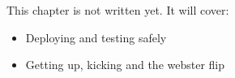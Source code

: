 \label{ch:k15}
\begin{keyidea}
This chapter is not written yet. It will cover:
\begin{itemize}[nosep]
  \item Deploying and testing safely
  \item Getting up, kicking and the webster flip
\end{itemize}
\end{keyidea}
